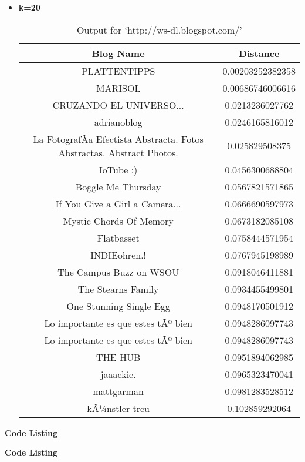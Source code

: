 \begin{itemize}
\newpage
\item \textbf{ k=20}
\begin{table}
\caption{Output for `http://ws-dl.blogspot.com/'}
\begin{center}
\hspace{-2cm}
\begin{tabular}{|c|c|}
\hline
 \textbf{Blog Name} & \textbf{Distance}\\ \hline
PLATTENTIPPS   & 0.00203252382358	 \\ \hline
MARISOL & 0.00686746006616	  \\ \hline
CRUZANDO EL UNIVERSO... &0.0213236027762	  \\ \hline
adrianoblog  &   0.0246165816012	  \\ \hline
La FotografÃ­a Efectista Abstracta. Fotos Abstractas. Abstract  Photos.& 0.025829508375	  \\ \hline
IoTube     :)   &0.0456300688804	  \\ \hline
Boggle Me Thursday   &   0.0567821571865	  \\ \hline
If You Give a Girl a Camera...&  0.0666690597973	  \\ \hline
Mystic Chords Of Memory& 0.0673182085108	   \\ \hline
Flatbasset   &   0.0758444571954	  \\ \hline
INDIEohren.! &   0.0767945198989	  \\ \hline
The Campus Buzz on WSOU& 0.0918046411881	  \\ \hline
The Stearns Family    &  0.0934455499801	  \\ \hline
One Stunning Single Egg& 0.0948170501912	  \\ \hline
Lo importante es que estes tÃº bien  &   0.0948286097743	  \\ \hline
Lo importante es que estes tÃº bien  &   0.0948286097743	  \\ \hline
THE HUB &0.0951894062985	   \\ \hline
jaaackie.  &     0.0965323470041	  \\ \hline
mattgarman   &   0.0981283528512	  \\ \hline
kÃ¼nstler treu & 0.102859292064	  \\ \hline

\end{tabular}
\end{center}
\end{table}
\end{itemize}
\newpage
\textbf{Code Listing}
\sloppy


\textbf{Code Listing}
\sloppy


